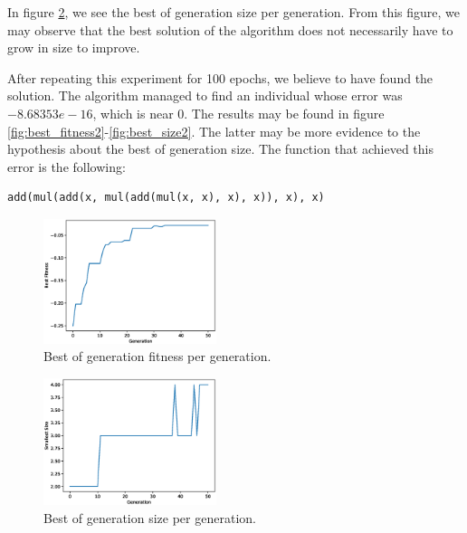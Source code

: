 \documentclass[11pt]{article}
\begin{document}
In figure \ref{fig:best_size}, we see the best of generation size per generation. From this figure, we may observe that the best solution of the algorithm does not necessarily have to grow in size to improve.

After repeating this experiment for 100 epochs, we believe to have found the solution. The algorithm managed to find an individual whose error was $-8.68353e-16$, which is near $0$. The results may be found in figure \ref{fig:best_fitness2}-\ref{fig:best_size2}. The latter may be more evidence to the hypothesis about the best of generation size. The function that achieved this error is the following:

\begin{verbatim}
add(mul(add(x, mul(add(mul(x, x), x), x)), x), x)
\end{verbatim}

\begin{multicols}{2}
\centering
\begin{figure}[H]
\includegraphics[width=0.45\textwidth]{images/genetic_best_fitness.eps}
\caption{Best of generation fitness per generation.}
\label{fig:best_fitness}
\end{figure}
\begin{figure}[H]
\includegraphics[width=0.45\textwidth]{images/genetic_best_size.eps}
\caption{Best of generation size per generation.}
\label{fig:best_size}
\end{figure}
\end{multicols}
\end{document}
